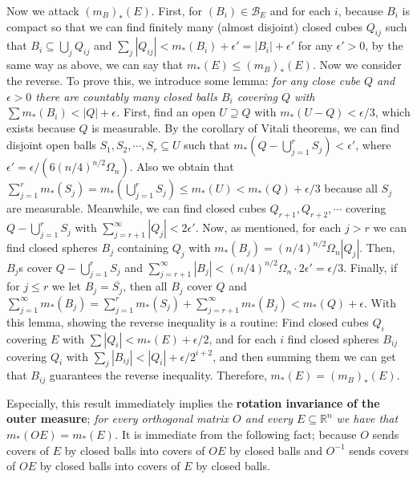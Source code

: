 \documentclass{article}
\newcommand{\ReR}{\mathbb{R}}
\begin{document}
Now we attack $(m_B)_*(E)$.
First, for $(B_i) \in \mathcal{B}_E$ and for each $i$, because $B_i$ is compact so that we can find finitely many (almost disjoint) closed cubes $Q_{ij}$ such that $B_i \subseteq \bigcup_j Q_{ij}$ and $\sum_j |Q_{ij}| < m_*(B_i) + \epsilon' = |B_i| + \epsilon'$ for any $\epsilon' > 0$, by the same way as above, we can say that $m_*(E) \le (m_B)_*(E)$.
Now we consider the reverse.
To prove this, we introduce some lemma: \textit{for any close cube $Q$ and $\epsilon > 0$ there are countably many closed balls $B_i$ covering $Q$ with $\sum m_*(B_i) < |Q| + \epsilon$.}
First, find an open $U \supseteq Q$ with $m_*(U - Q) < \epsilon / 3$, which exists because $Q$ is measurable.
By the corollary of Vitali theorems, we can find disjoint open balls $S_1, S_2, \cdots, S_r \subseteq U$ such that $m_*(Q - \bigcup_{j = 1}^r S_j) < \epsilon'$, where $\epsilon' = \epsilon / (6 (n/4)^{n/2} \Omega_n)$.
Also we obtain that $\sum_{j = 1}^r m_*(S_j) = m_*(\bigcup_{j = 1}^r S_j) \le m_*(U) < m_*(Q) + \epsilon / 3$ because all $S_j$ are measurable.
Meanwhile, we can find closed cubes $Q_{r + 1}, Q_{r + 2}, \cdots$ covering $Q - \bigcup_{j = 1}^r S_j$ with $\sum_{j = r + 1}^\infty |Q_j| < 2\epsilon'$.
Now, as mentioned, for each $j > r$ we can find closed spheres $B_j$ containing $Q_j$ with $m_*(B_j) = (n/4)^{n/2} \Omega_n |Q_j|$.
Then, $B_j$s cover $Q - \bigcup_{j = 1}^r S_j$ and $\sum_{j = r + 1}^\infty |B_j| < (n/4)^{n/2} \Omega_n \cdot 2\epsilon' = \epsilon / 3$.
Finally, if for $j \le r$ we let $B_j = \overline{S_j}$, then all $B_j$ cover $Q$ and $\sum_{j = 1}^\infty m_*(B_j) = \sum_{j = 1}^r m_*(S_j) + \sum_{j = r + 1}^\infty m_*(B_j) < m_*(Q) + \epsilon$.
With this lemma, showing the reverse inequality is a routine: Find closed cubes $Q_i$ covering $E$ with $\sum |Q_i| < m_*(E) + \epsilon / 2$, and for each $i$ find closed spheres $B_{ij}$ covering $Q_i$ with $\sum_{j} |B_{ij}| < |Q_i| + \epsilon / 2^{i + 2}$, and then summing them we can get that $B_{ij}$ guarantees the reverse inequality.
Therefore, $m_*(E) = (m_B)_*(E)$.

Especially, this result immediately implies the \textbf{rotation invariance of the outer measure}; \textit{for every orthogonal matrix $O$ and every $E \subseteq \ReR^n$ we have that $m_*(OE) = m_*(E)$.}
It is immediate from the following fact; because $O$ sends covers of $E$ by closed balls into covers of $OE$ by closed balls and $O^{-1}$ sends covers of $OE$ by closed balls into covers of $E$ by closed balls.

\newpage
\end{document}
